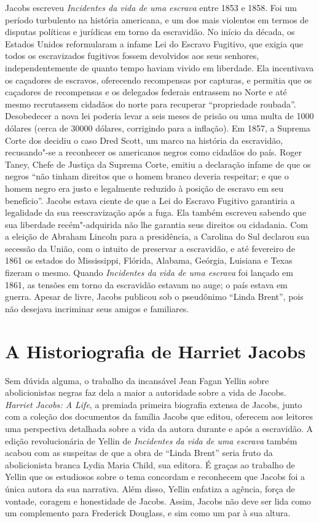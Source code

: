 Jacobs escreveu \emph{Incidentes da vida de uma escrava} entre 1853 e
1858. Foi um período turbulento na história americana, e um dos mais
violentos em termos de disputas políticas e jurídicas
em torno da escravidão. No início da década, os Estados Unidos
reformularam a infame Lei do Escravo Fugitivo, que exigia que todos os
escravizados fugitivos fossem devolvidos aos seus senhores,
independentemente de quanto tempo haviam vivido em liberdade. Ela
incentivava os caçadores de escravos, oferecendo recompensas por
capturas, e permitia que os caçadores de recompensas e os delegados
federais entrassem no Norte e até mesmo recrutassem cidadãos do norte
para recuperar ``propriedade roubada''. Desobedecer a nova lei poderia
levar a seis meses de prisão ou uma multa de 1000 dólares (cerca de
30000 dólares, corrigindo para a inflação). Em 1857, a Suprema Corte
dos  decidiu o caso Dred Scott, um marco na história da escravidão,
recusando"-se a reconhecer os americanos negros como cidadãos do país.
Roger Taney, Chefe de Justiça da Suprema Corte, emitiu a declaração
infame de que os negros ``não tinham direitos que o homem branco deveria
respeitar; e que o homem negro era justo e legalmente reduzido à posição
de escravo em seu benefício''. Jacobs estava ciente de que a Lei do
Escravo Fugitivo garantiria a legalidade da sua reescravização após a
fuga. Ela também escreveu sabendo que sua liberdade recém"-adquirida não
lhe garantia seus direitos ou cidadania. Com a eleição de Abraham
Lincoln para a presidência, a Carolina do Sul declarou sua secessão da
União, com o intuito de preservar a escravidão, e até fevereiro de 1861
os estados do Mississippi, Flórida, Alabama, Geórgia, Luisiana e Texas
fizeram o mesmo. Quando \emph{Incidentes da vida de uma escrava} foi
lançado em 1861, as tensões em torno da escravidão estavam no auge; o
país estava em guerra. Apesar de livre, Jacobs publicou sob o pseudônimo
``Linda Brent'', pois não desejava incriminar seus amigos e familiares.

\section{A Historiografia de Harriet Jacobs}

Sem dúvida alguma, o trabalho da incansável Jean Fagan Yellin sobre
abolicionistas negras faz dela a maior a autoridade sobre a vida de
Jacobs. \emph{Harriet Jacobs: A Life}, a premiada primeira biografia
extensa de Jacobs, junto com a coleção dos documentos da família Jacobs
que editou, oferecem aos leitores uma perspectiva detalhada sobre a vida
da autora durante e após a escravidão. A edição revolucionária de Yellin
de \emph{Incidentes da vida de uma escrava} também acabou com as
suspeitas de que a obra de ``Linda Brent'' seria fruto da abolicionista
branca Lydia Maria Child, sua editora. É graças ao trabalho de Yellin
que os estudiosos sobre o tema concordam e reconhecem que Jacobs foi a
única autora da sua narrativa. Além disso, Yellin enfatiza a agência,
força de vontade, coragem e honestidade de Jacobs. Assim, Jacobs não
deve ser lida como um complemento para Frederick Douglass, e sim como um
par à sua altura.

